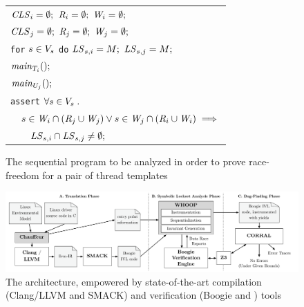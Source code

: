 \begin{figure}
\footnotesize
\begin{tabular}{l}
$\mathit{CLS}_{i} = \emptyset;$ $\mathit{R}_{i} = \emptyset;$ $\mathit{W}_{i} = \emptyset;$ \\
$\mathit{CLS}_{j} = \emptyset;$ $\mathit{R}_{j} = \emptyset;$ $\mathit{W}_{j} = \emptyset;$ \\
\texttt{for} $s \in V_s$ \texttt{do} $\mathit{LS}_{s,i} = M;$ $\mathit{LS}_{s,j} = M;$ \smallskip
\\

$\mathit{main}_{T_{i}}();$ \\
$\mathit{main}_{U_{j}}();$ \smallskip\\

\texttt{assert} $\forall s \in V_s \; .$ \\

$\quad s \in \mathit{W}_{i} \cap (\mathit{R}_{j} \cup \mathit{W}_{j}) \vee s \in \mathit{W}_{j} \cap (\mathit{R}_{i} \cup \mathit{W}_{i}) \implies$ \\

$\quad\quad \mathit{LS}_{s,i} \cap \mathit{LS}_{s,j} \neq \emptyset;$ \\

\end{tabular}
\caption{The sequential program to be analyzed in order to prove race-freedom for a pair of thread templates}
\label{fig:sequentialization}
\end{figure}

\begin{figure}
\centering
\includegraphics[width=.99\linewidth]{img/whoop.pdf}
\caption{The \whoop architecture, empowered by state-of-the-art compilation (Clang/LLVM and SMACK) and verification (Boogie and \corral) tools}
\label{fig:whoop}
\end{figure}

